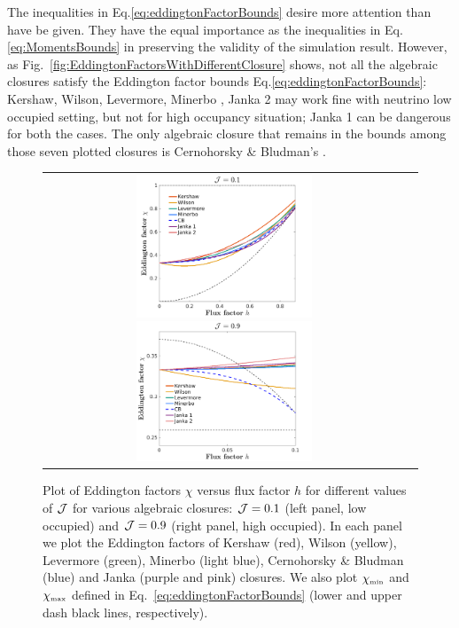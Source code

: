 The inequalities in Eq.\ref{eq:eddingtonFactorBounds} desire more attention than have be given.
They have the equal importance as the inequalities in Eq.\ref{eq:MomentsBounds} in preserving the validity of the simulation result.
However, as Fig.~\eqref{fig:EddingtonFactorsWithDifferentClosure} shows, not all the algebraic closures satisfy the Eddington factor bounds Eq.\ref{eq:eddingtonFactorBounds}: Kershaw\cite{kershaw_1976}, Wilson\cite{wilson1975,leblanc1970}, Levermore\cite{levermore_1984}, Minerbo \cite{minerbo_1978}, Janka 2\cite{janka1992} may work fine with neutrino low occupied setting, but not for high occupancy situation; Janka 1\cite{janka1991} can be dangerous for both the cases. The only algebraic closure that remains in the bounds among those seven plotted closures is Cernohorsky \& Bludman's \cite{cernohorskyBludman_1994}.
\begin{figure}[h]
  \centering
  \begin{tabular}{cc}
    \includegraphics[width=0.5\textwidth]{figures/Closures0_10}
    \includegraphics[width=0.5\textwidth]{figures/Closures0_90}
  \end{tabular}
   \caption{Plot of Eddington factors $\chi$ versus flux factor $h$ for different values of $\mathcal{J}$ for various algebraic closures: $\mathcal{J}=0.1$ (left panel, low occupied) and $\mathcal{J}=0.9$ (right panel, high occupied).  In each panel we plot the Eddington factors of Kershaw (red), Wilson (yellow), Levermore (green), Minerbo (light blue), Cernohorsky \& Bludman (blue) and Janka (purple and pink) closures.  We also plot $\chi_{\mbox{\tiny min}}$ and $\chi_{\mbox{\tiny max}}$ defined in Eq.~\eqref{eq:eddingtonFactorBounds} (lower and upper dash black lines, respectively).}
  \label{fig:EddingtonFactorsWithDifferentClosure}
\end{figure}

